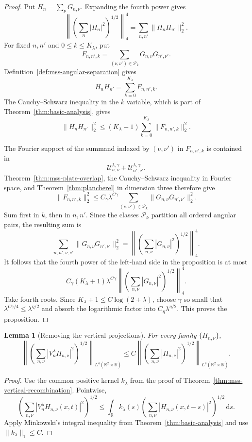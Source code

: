 \documentclass[11pt]{article}
\numberwithin{equation}{section}
\newtheorem{lemma}[theorem]{Lemma}
\theoremstyle{definition}
\theoremstyle{remark}
\newcommand{\R}{\mathbb R}
\newcommand{\dd}{\,\mathrm d}
\begin{document}
\begin{proof}
Put $H_n=\sum_\nu G_{n,\nu}$.  Expanding the fourth power gives
\[
\left\|\left(\sum_n|H_n|^2\right)^{1/2}\right\|_4^4
=\sum_{n,n'}\|H_nH_{n'}\|_2^2.
\]
For fixed $n,n'$ and $0\le k\le K_\lambda$, put
\[
F_{n,n',k}
=\sum_{(\nu,\nu')\in\mathcal P_k}
G_{n,\nu}G_{n',\nu'}.
\]
Definition~\ref{def:mss-angular-separation} gives
\[
H_nH_{n'}=\sum_{k=0}^{K_\lambda}F_{n,n',k}.
\]
The Cauchy--Schwarz inequality in the $k$ variable, which is part of Theorem~\ref{thm:basic-analysis}, gives
\[
\|H_nH_{n'}\|_2^2
\le (K_\lambda+1)\sum_{k=0}^{K_\lambda}
\|F_{n,n',k}\|_2^2.
\]

The Fourier support of the summand indexed by $(\nu,\nu')$ in $F_{n,n',k}$ is contained in
\[
\mathcal U_{n,\nu}^{\lambda,\gamma}
+\mathcal U_{n',\nu'}^{\lambda,\gamma}.
\]
Theorem~\ref{thm:mss-plate-overlap}, the Cauchy--Schwarz inequality in Fourier space, and Theorem~\ref{thm:plancherel} in dimension three therefore give
\[
\|F_{n,n',k}\|_2^2
\le C_\gamma\lambda^{C\gamma}
\sum_{(\nu,\nu')\in\mathcal P_k}
\|G_{n,\nu}G_{n',\nu'}\|_2^2.
\]
Sum first in $k$, then in $n,n'$.  Since the classes $\mathcal P_k$ partition all ordered angular pairs, the resulting sum is
\[
\sum_{n,n',\nu,\nu'}
\|G_{n,\nu}G_{n',\nu'}\|_2^2
=
\left\|\left(\sum_{n,\nu}|G_{n,\nu}|^2\right)^{1/2}\right\|_4^4.
\]
It follows that the fourth power of the left-hand side in the proposition is at most
\[
C_\gamma(K_\lambda+1)\lambda^{C\gamma}
\left\|\left(\sum_{n,\nu}|G_{n,\nu}|^2\right)^{1/2}\right\|_4^4.
\]
Take fourth roots.  Since $K_\lambda+1\le C\log(2+\lambda)$, choose $\gamma$ so small that $\lambda^{C\gamma/4}\le\lambda^{\eta/2}$ and absorb the logarithmic factor into $C_\eta\lambda^{\eta/2}$.  This proves the proposition.
\end{proof}

\begin{lemma}[Removing the vertical projections]\label{lem:mss-remove-vertical}
For every family $\{H_{n,\nu}\}$,
\[
\left\|\left(\sum_{n,\nu}|V_n^\lambda H_{n,\nu}|^2\right)^{1/2}\right\|_{L^4(\R^2\times\R)}
\le C
\left\|\left(\sum_{n,\nu}|H_{n,\nu}|^2\right)^{1/2}\right\|_{L^4(\R^2\times\R)}.
\]
\end{lemma}

\begin{proof}
Use the common positive kernel $k_\lambda$ from the proof of Theorem~\ref{thm:mss-vertical-recombination}.  Pointwise,
\[
\left(\sum_{n,\nu}|V_n^\lambda H_{n,\nu}(x,t)|^2\right)^{1/2}
\le\int_\R k_\lambda(s)
\left(\sum_{n,\nu}|H_{n,\nu}(x,t-s)|^2\right)^{1/2}\dd s.
\]
Apply Minkowski's integral inequality from Theorem~\ref{thm:basic-analysis} and use $\|k_\lambda\|_1\le C$.
\end{proof}
\end{document}
